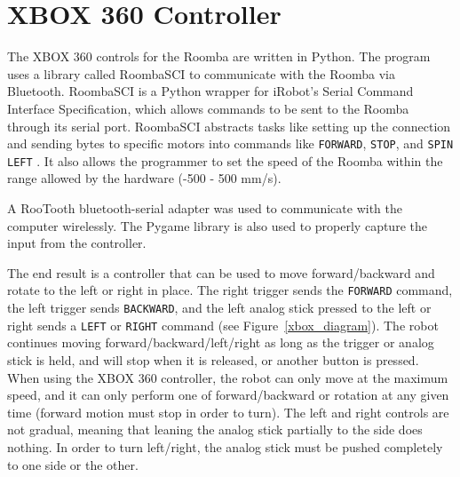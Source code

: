 \documentclass[12pt, letterpaper]{report}
\begin{document}
\section{XBOX 360 Controller}
The XBOX 360 controls for the Roomba are written in Python. The program uses a library called RoombaSCI to communicate with the Roomba via Bluetooth. RoombaSCI is a Python wrapper for iRobot's Serial Command Interface Specification, which allows commands to be sent to the Roomba through its serial port. RoombaSCI abstracts tasks like setting up the connection and sending bytes to specific motors into commands like \texttt{FORWARD}, \texttt{STOP}, and \texttt{SPIN LEFT} \cite{RoombaSCI}. It also allows the programmer to set the speed of the Roomba within the range allowed by the hardware (-500 - 500 mm/s)\cite{iRobot}.

A RooTooth bluetooth-serial adapter was used to communicate with the computer wirelessly. The Pygame library is also used to properly capture the input from the controller. 

The end result is a controller that can be used to move forward/backward and rotate to the left or right in place. The right trigger sends the \texttt{FORWARD} command, the left trigger sends \texttt{BACKWARD}, and the left analog stick pressed to the left or right sends a \texttt{LEFT} or \texttt{RIGHT} command (see Figure~\ref{xbox_diagram}). The robot continues moving forward/backward/left/right as long as the trigger or analog stick is held, and will stop when it is released, or another button is pressed. When using the XBOX 360 controller, the robot can only move at the maximum speed, and it can only perform one of forward/backward or rotation at any given time (forward motion must stop in order to turn). The left and right controls are not gradual, meaning that leaning the analog stick partially to the side does nothing. In order to turn left/right, the analog stick must be pushed completely to one side or the other.
\end{document}
